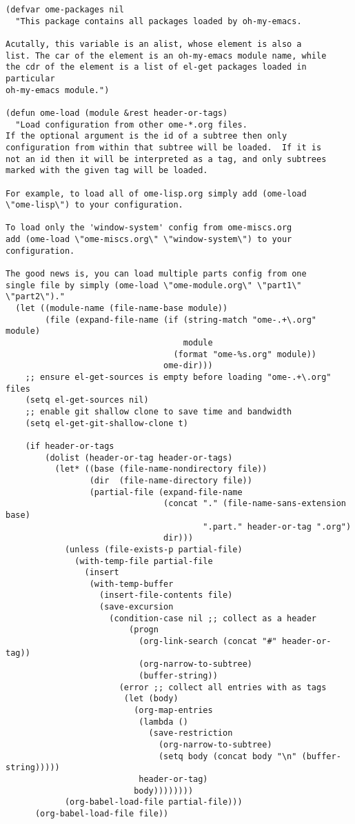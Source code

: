 \documentclass[11pt]{article}
\begin{document}
\begin{verbatim}
(defvar ome-packages nil
  "This package contains all packages loaded by oh-my-emacs.

Acutally, this variable is an alist, whose element is also a
list. The car of the element is an oh-my-emacs module name, while
the cdr of the element is a list of el-get packages loaded in particular
oh-my-emacs module.")

(defun ome-load (module &rest header-or-tags)
  "Load configuration from other ome-*.org files.
If the optional argument is the id of a subtree then only
configuration from within that subtree will be loaded.  If it is
not an id then it will be interpreted as a tag, and only subtrees
marked with the given tag will be loaded.

For example, to load all of ome-lisp.org simply add (ome-load
\"ome-lisp\") to your configuration.

To load only the 'window-system' config from ome-miscs.org
add (ome-load \"ome-miscs.org\" \"window-system\") to your
configuration.

The good news is, you can load multiple parts config from one
single file by simply (ome-load \"ome-module.org\" \"part1\"
\"part2\")."
  (let ((module-name (file-name-base module))
        (file (expand-file-name (if (string-match "ome-.+\.org" module)
                                    module
                                  (format "ome-%s.org" module))
                                ome-dir)))
    ;; ensure el-get-sources is empty before loading "ome-.+\.org" files
    (setq el-get-sources nil)
    ;; enable git shallow clone to save time and bandwidth
    (setq el-get-git-shallow-clone t)

    (if header-or-tags
        (dolist (header-or-tag header-or-tags)
          (let* ((base (file-name-nondirectory file))
                 (dir  (file-name-directory file))
                 (partial-file (expand-file-name
                                (concat "." (file-name-sans-extension base)
                                        ".part." header-or-tag ".org")
                                dir)))
            (unless (file-exists-p partial-file)
              (with-temp-file partial-file
                (insert
                 (with-temp-buffer
                   (insert-file-contents file)
                   (save-excursion
                     (condition-case nil ;; collect as a header
                         (progn
                           (org-link-search (concat "#" header-or-tag))
                           (org-narrow-to-subtree)
                           (buffer-string))
                       (error ;; collect all entries with as tags
                        (let (body)
                          (org-map-entries
                           (lambda ()
                             (save-restriction
                               (org-narrow-to-subtree)
                               (setq body (concat body "\n" (buffer-string)))))
                           header-or-tag)
                          body))))))))
            (org-babel-load-file partial-file)))
      (org-babel-load-file file))


\end{verbatim}
\end{document}
